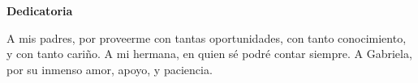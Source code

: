 \section*{}
\vspace{8cm}
\textbf{\Large Dedicatoria}
\newline

A mis padres, por proveerme con tantas oportunidades, con tanto conocimiento, y con tanto cariño. 
%
A mi hermana, en quien sé podré contar siempre. 
%
A Gabriela, por su inmenso amor, apoyo, y paciencia.